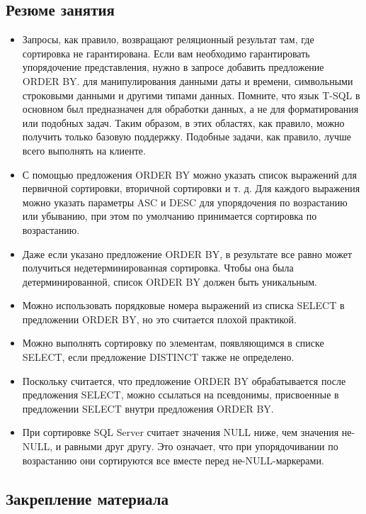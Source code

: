 \subsection*{Резюме занятия}
\begin{itemize}
	\item Запросы, как правило, возвращают реляционный результат там, где сортировка
	не гарантирована. Если вам необходимо гарантировать упорядочение представления, нужно в запросе добавить предложение ORDER BY. 
	для манипулирования данными даты и времени, символьными строковыми данными и другими типами данных. Помните, что язык T-SQL в основном был
	предназначен для обработки данных, а не для форматирования или подобных
	задач. Таким образом, в этих областях, как правило, можно получить только
	базовую поддержку. Подобные задачи, как правило, лучше всего выполнять на
	клиенте. 
	\item С помощью предложения ORDER BY можно указать список выражений для первичной сортировки, вторичной сортировки и т. д. Для каждого выражения можно указать параметры ASC и DESC для упорядочения по возрастанию или убыванию, при этом по умолчанию принимается сортировка по возрастанию. 
	\item Даже если указано предложение ORDER BY, в результате все равно может получиться недетерминированная сортировка. Чтобы она была детерминированной,
	список ORDER BY должен быть уникальным.
	\item Можно использовать порядковые номера выражений из списка SELECT в предложении ORDER BY, но это считается плохой практикой. 
	\item Можно выполнять сортировку по элементам, появляющимся в списке SELECT,
	если предложение DISTINCT также не определено.
	\item Поскольку считается, что предложение ORDER BY обрабатывается после предложения SELECT, можно ссылаться на псевдонимы, присвоенные в предложении
	SELECT внутри предложения ORDER BY.
	\item При сортировке SQL Server считает значения NULL ниже, чем значения не-NULL, и
	равными друг другу. Это означает, что при упорядочивании по возрастанию они
	сортируются все вместе перед не-NULL-маркерами. 	
\end{itemize}


\subsection*{Закрепление материала}

